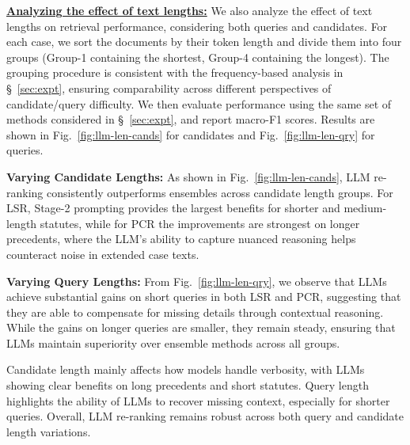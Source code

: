


\noindent\underline{\bf Analyzing the effect of text lengths:} \label{app:lenanalysis}
We also analyze the effect of text lengths on retrieval performance, considering both queries and candidates. For each case, we sort the documents by their token length and divide them into four groups (Group-1 containing the shortest, Group-4 containing the longest). The grouping procedure is consistent with the frequency-based analysis in \S~\ref{sec:expt}, ensuring comparability across different perspectives of candidate/query difficulty. We then evaluate performance using the same set of methods considered in \S~\ref{sec:expt}, and report macro-F1 scores. Results are shown in Fig.~\ref{fig:llm-len-cands} for candidates and Fig.~\ref{fig:llm-len-qry} for queries.  

\noindent\textbf{Varying Candidate Lengths:}  
As shown in Fig.~\ref{fig:llm-len-cands}, LLM re-ranking consistently outperforms ensembles across candidate length groups. For LSR, Stage-2 prompting provides the largest benefits for shorter and medium-length statutes, while for PCR the improvements are strongest on longer precedents, where the LLM’s ability to capture nuanced reasoning helps counteract noise in extended case texts.  

\noindent\textbf{Varying Query Lengths:}  
From Fig.~\ref{fig:llm-len-qry}, we observe that LLMs achieve substantial gains on short queries in both LSR and PCR, suggesting that they are able to compensate for missing details through contextual reasoning. While the gains on longer queries are smaller, they remain steady, ensuring that LLMs maintain superiority over ensemble methods across all groups.  

\noindent Candidate length mainly affects how models handle verbosity, with LLMs showing clear benefits on long precedents and short statutes. Query length highlights the ability of LLMs to recover missing context, especially for shorter queries. Overall, LLM re-ranking remains robust across both query and candidate length variations.

